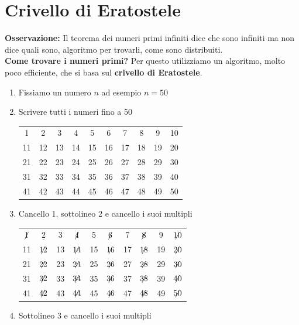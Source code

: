 \documentclass[12pt, letterpaper]{report}
\begin{document}
		\section{Crivello di Eratostele}
		\textbf{Osservazione:} Il teorema dei numeri primi infiniti dice che sono infiniti ma non dice quali sono, algoritmo per trovarli, come sono distribuiti. \\
		\textbf{Come trovare i numeri primi?} Per questo utilizziamo un algoritmo, molto poco efficiente, che si basa sul \textbf{crivello di Eratostele}. \\
		\begin{enumerate}
			\item Fissiamo un numero $n$ ad esempio $n = 50$
			\item Scrivere tutti i numeri fino a 50 \\
				\begin{tabular}{c c c c c c c c c c}
					1 & 2 & 3 & 4 & 5 & 6 & 7 & 8 & 9 & 10 \\
					11 & 12 & 13 & 14 & 15 & 16 & 17 & 18 & 19 & 20 \\
					21 & 22 & 23 & 24 & 25 & 26 & 27 & 28 & 29 & 30 \\
					31 & 32 & 33 & 34 & 35 & 36 & 37 & 38 & 39 & 40 \\
					41 & 42 & 43 & 44 & 45 & 46 & 47 & 48 & 49 & 50
				\end{tabular}
			\item Cancello 1, sottolineo 2 e cancello i suoi multipli \\
			\begin{tabular}{c c c c c c c c c c}
				$\centernot{1}$ & $\underline{2}$ & 3 & $\centernot{4}$ & 5 & $\centernot{6}$ & 7 & $\centernot{8}$ & 9 & $\centernot{10}$ \\
				11 & $\centernot{12}$ & 13 & $\centernot{14}$ & 15 & $\centernot{16}$ & 17 & $\centernot{18}$ & 19 & $\centernot{20}$ \\
				21 & $\centernot{22}$ & 23 & $\centernot{24}$ & 25 & $\centernot{26}$ & 27 & $\centernot{28}$ & 29 & $\centernot{30}$ \\
				31 & $\centernot{32}$ & 33 & $\centernot{34}$ & 35 & $\centernot{36}$ & 37 & $\centernot{38}$ & 39 & $\centernot{40}$ \\
				41 & $\centernot{42}$ & 43 & $\centernot{44}$ & 45 & $\centernot{46}$ & 47 & $\centernot{48}$ & 49 & $\centernot{50}$
			\end{tabular}
			\item Sottolineo 3 e cancello i suoi multipli  \\

\end{enumerate}
\end{document}
